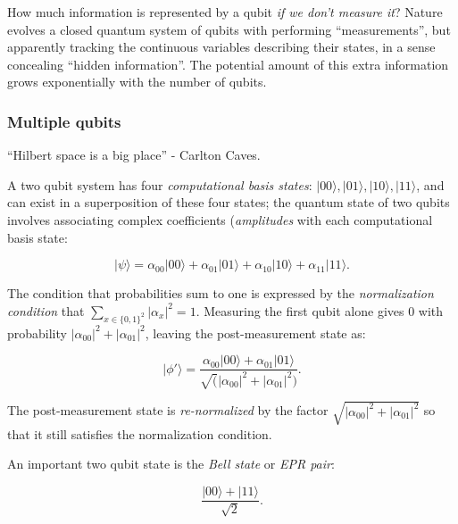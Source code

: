 \documentclass{article}
\numberwithin{equation}{section}
\newcommand{\bracket}[1]{|#1\rangle}
\begin{document}
How much information is represented by a qubit \textit{if we don't measure it}? Nature evolves a closed quantum system of qubits with performing ``measurements'', but apparently tracking the continuous variables describing their states, in a sense concealing ``hidden information''. The potential amount of this extra information grows exponentially with the number of qubits.

\subsubsection{Multiple qubits}

``Hilbert space is a big place'' - Carlton Caves.

A two qubit system has four \textit{computational basis states}: $\bracket{00}, \bracket{01}, \bracket{10}, \bracket{11}$, and can exist in a superposition of these four states; the quantum state of two qubits involves associating complex coefficients (\textit{amplitudes} with each computational basis state:

\begin{equation} \label{eq:1.4}
\bracket{\psi} = \alpha_{00} \bracket{00} + \alpha_{01} \bracket{01} + \alpha_{10} \bracket{10} + \alpha_{11} \bracket{11}.
\end{equation}

The condition that probabilities sum to one is expressed by the \textit{normalization condition} that $\sum_{x \in \{0, 1\}^2} |\alpha_x|^2 = 1$. Measuring the first qubit alone gives 0 with probability $|\alpha_{00}|^2 + |\alpha_{01}|^2$, leaving the post-measurement state as:

\begin{equation} \label{eq:1.5}
\bracket{\phi'} = \frac{\alpha_{00} \bracket{00} + \alpha_{01} \bracket{01}}{\sqrt(|\alpha_{00}|^2 + |\alpha_{01}|^2)}.
\end{equation}

The post-measurement state is \textit{re-normalized} by the factor $\sqrt{|\alpha_{00}|^2 + |\alpha_{01}|^2}$ so that it still satisfies the normalization condition.

An important two qubit state is the \textit{Bell state} or \textit{EPR pair}:

\begin{equation} \label{eq:1.7}
\frac{\bracket{00} + \bracket{11}}{\sqrt{2}}.
\end{equation}
\end{document}
